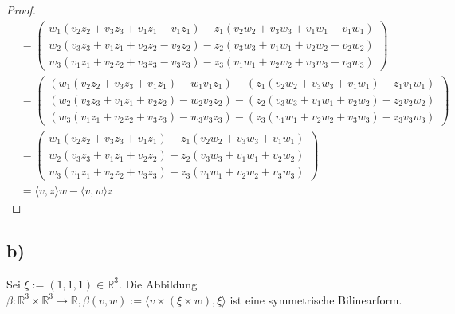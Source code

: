 \documentclass{article}
\newcommand{\RR}{\mathbb{R}}
\begin{document}
\begin{proof}
\[\begin{aligned}
        &=
        \begin{pmatrix}
            w_1(v_2  z_2 + v_3  z_3 + v_1  z_1 - v_1  z_1) - z_1(v_2 w_2  + v_3 w_3 + v_1  w_1 - v_1  w_1)  \\
            w_2(v_3  z_3 + v_1  z_1 + v_2  z_2 - v_2  z_2) - z_2(v_3 w_3  + v_1 w_1 + v_2  w_2 - v_2  w_2)  \\
            w_3(v_1  z_1 + v_2  z_2 + v_3  z_3 - v_3  z_3) - z_3(v_1 w_1  + v_2 w_2 + v_3  w_3 - v_3  w_3) 
        \end{pmatrix}  \\
        &=
        \begin{pmatrix}
            (w_1(v_2  z_2 + v_3  z_3 + v_1  z_1) - w_1 v_1  z_1) - (z_1(v_2 w_2  + v_3 w_3 + v_1  w_1) - z_1 v_1  w_1)  \\
            (w_2(v_3  z_3 + v_1  z_1 + v_2  z_2) - w_2 v_2  z_2) - (z_2(v_3 w_3  + v_1 w_1 + v_2  w_2) - z_2 v_2  w_2)  \\
            (w_3(v_1  z_1 + v_2  z_2 + v_3  z_3) - w_3 v_3  z_3) - (z_3(v_1 w_1  + v_2 w_2 + v_3  w_3) - z_3 v_3  w_3) 
        \end{pmatrix} \\
        &=
        \begin{pmatrix}
            w_1(v_2  z_2 + v_3  z_3 + v_1  z_1) - z_1(v_2 w_2  + v_3 w_3 + v_1  w_1) \\
            w_2(v_3  z_3 + v_1  z_1 + v_2  z_2) - z_2(v_3 w_3  + v_1 w_1 + v_2  w_2) \\
            w_3(v_1  z_1 + v_2  z_2 + v_3  z_3) - z_3(v_1 w_1  + v_2 w_2 + v_3  w_3) 
        \end{pmatrix} \\
        &=
        \langle v, z \rangle w - \langle v, w \rangle z
    \end{aligned}
    \]
    
 \end{proof}


 \subsection*{b)}
 Sei
 $\xi := (1,1,1) \in \RR^3$.
 Die Abbildung
 $\beta : \RR^3 \times \RR^3 \to \RR,
 \beta(v, w) := \langle v \times (\xi \times w), \xi \rangle$
 ist eine symmetrische Bilinearform.
\end{document}
